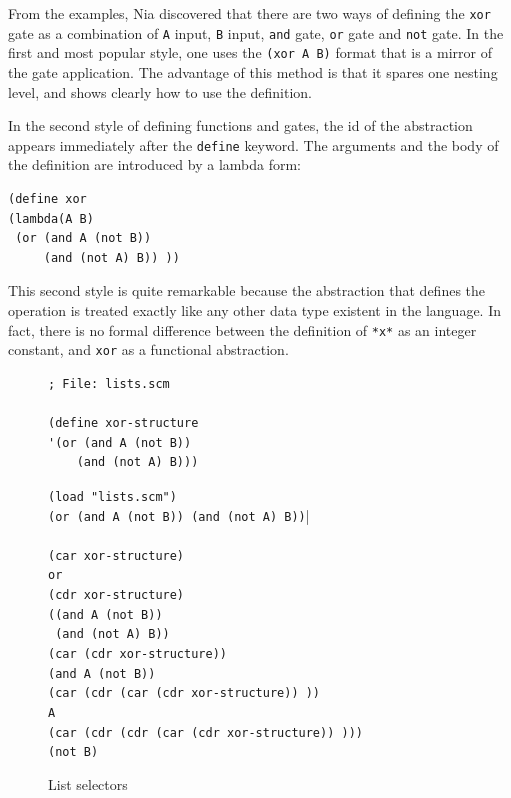 \documentclass[a4paper,12pt]{book}
\newenvironment{fmpage}[1]
           {\begin{lrbox}{\fmbox}\begin{minipage}{#1}}
           {\end{minipage}\end{lrbox}\fbox{\usebox{\fmbox}}}
\begin{document}
From the examples, Nia discovered that there
are two ways of defining the \verb|xor| gate
as a combination of \verb|A| input, \verb|B| input,
\verb|and| gate, \verb|or| gate
and \verb|not| gate. In the first and
most popular style, one uses the
\verb|(xor A B)| format that is a mirror of
the gate application. The advantage of
this method is that it spares one
nesting level, and shows clearly how to use
the definition. 

In the second style of defining functions and
gates, the id of the abstraction 
appears immediately after the \verb|define|
keyword. The  arguments and the body of
the definition are introduced by a lambda form:
\label{page:lambda1}

\begin{verbatim}
(define xor
(lambda(A B)
 (or (and A (not B))
     (and (not A) B)) ))
\end{verbatim}

This second style is quite remarkable because
the abstraction that defines the operation
is treated exactly like any other
data type existent in the language.
In fact, there is no formal difference
between the definition of \verb|*x*|
as an integer constant, and \verb|xor|
as a functional abstraction.

\begin{figure}[!h]
\begin{fmpage}{0.8\linewidth}
\begin{verbatim}
; File: lists.scm

(define xor-structure
'(or (and A (not B))
    (and (not A) B)))
\end{verbatim}
\end{fmpage}

\begin{fmpage}{0.8\linewidth}
\verb|(load "lists.scm")|\keys{~]~}\\
\verb|(or (and A (not B)) (and (not A) B))||\\
\verb||\\
\verb|(car xor-structure)| \keys{~]~} \\
\verb|or|\\
\verb|(cdr xor-structure)|\keys{~]~}\\
\verb|((and A (not B))|\\
\verb| (and (not A) B))|\\
\verb|(car (cdr xor-structure))|\keys{~]~}\\
\verb|(and A (not B))|\\
\verb|(car (cdr (car (cdr xor-structure)) ))|\keys{~]~}\\
\verb|A|\\
\verb|(car (cdr (cdr (car (cdr xor-structure)) )))|\keys{~]~}\\
\verb|(not B)|
\end{fmpage}

\begin{fmpage}{0.8\linewidth}
\verb||
\end{fmpage}
\caption{List selectors}
\label{fig:selectors}
\end{figure}
\end{document}
